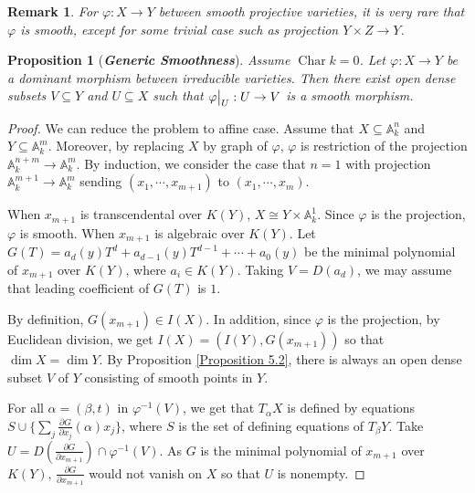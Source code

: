 \documentclass{ctexart}
\newtheorem{remark}{Remark}[section]
\newtheorem{proposition}{Proposition}[section]
\newcommand{\characteristic}{\operatorname{Char}}
\begin{document}
\begin{remark}
    For $\varphi: X \rightarrow Y$ between smooth projective varieties,
    it is very rare that $\varphi$ is smooth, except for some trivial case such as projection $Y \times Z \rightarrow Y$.
\end{remark}
\begin{proposition}[\textbf{\emph{Generic Smoothness}}]
    Assume $\characteristic k = 0$.
    Let $\varphi: X \rightarrow Y$ be a dominant morphism between irreducible varieties.
    Then there exist open dense subsets $V \subseteq Y$ and $U \subseteq X$ such that $\varphi\big{|}_{U}: U \rightarrow V$ is a smooth morphism.
    \label{Proposition 5.6}
\end{proposition}
\begin{proof}
    We can reduce the problem to affine case.
    Assume that $X \subseteq \mathbb{A}_{k}^{n}$ and $Y \subseteq \mathbb{A}_{k}^{m}$.
    Moreover, by replacing $X$ by graph of $\varphi$, $\varphi$ is restriction of the projection $\mathbb{A}_{k}^{n + m} \rightarrow \mathbb{A}_{k}^{m}$.
    By induction, we consider the case that $n = 1$ with projection $\mathbb{A}_{k}^{m + 1} \rightarrow \mathbb{A}_{k}^{m}$ sending $(x_{1}, \cdots, x_{m + 1})$ to $(x_{1}, \cdots, x_{m})$.
    \par
    When $x_{m + 1}$ is transcendental over $K(Y)$, $X \cong Y \times \mathbb{A}_{k}^{1}$.
    Since $\varphi$ is the projection, $\varphi$ is smooth.
    When $x_{m + 1}$ is algebraic over $K(Y)$.
    Let $G(T) = a_{d}(y)T^{d} + a_{d - 1}(y)T^{d - 1} + \cdots + a_{0}(y)$ be the minimal polynomial of $x_{m + 1}$ over $K(Y)$, where $a_{i}\in K(Y)$.
    Taking $V = D(a_{d})$, we may assume that leading coefficient of $G(T)$ is $1$.
    \par
    By definition, $G(x_{m + 1})\in I(X)$.
    In addition, since $\varphi$ is the projection,
    by Euclidean division, we get $I(X) = (I(Y), G(x_{m + 1}))$ so that $\dim X = \dim Y$.
    By Proposition \ref{Proposition 5.2}, 
    there is always an open dense subset $V$ of $Y$ consisting of smooth points in $Y$.
    \par
    For all $\alpha = (\beta, t)$ in $\varphi^{-1}(V)$, we get that $T_{\alpha}X$ is defined by equations $S \cup \{\sum_{j} \frac{\partial G}{\partial x_{j}}(\alpha)x_{j}\}$,
    where $S$ is the set of defining equations of $T_{\beta}Y$.
    Take $U = D(\frac{\partial G}{\partial x_{m + 1}}) \cap \varphi^{-1}(V)$.
    As $G$ is the minimal polynomial of $x_{m + 1}$ over $K(Y)$, 
    $\frac{\partial G}{\partial x_{m + 1}}$ would not vanish on $X$ so that $U$ is nonempty.

\end{proof}
\end{document}
